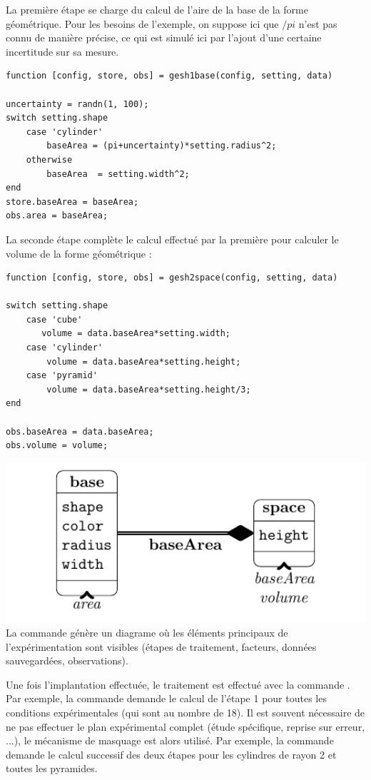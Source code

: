 La première étape se charge du calcul de l'aire de la base de la forme géométrique. Pour les besoins de l'exemple, on suppose ici que $/pi$ n'est pas connu de manière précise, ce qui est simulé ici par l'ajout d'une certaine incertitude sur sa mesure.

\begin{lstlisting}
function [config, store, obs] = gesh1base(config, setting, data)

uncertainty = randn(1, 100);
switch setting.shape
    case 'cylinder'
        baseArea = (pi+uncertainty)*setting.radius^2;
    otherwise
        baseArea  = setting.width^2;
end
store.baseArea = baseArea;
obs.area = baseArea;
\end{lstlisting}

La seconde étape complète le calcul effectué par la première pour calculer le volume de la forme géométrique :
\begin{lstlisting}
function [config, store, obs] = gesh2space(config, setting, data)

switch setting.shape
    case 'cube'
       volume = data.baseArea*setting.width;
    case 'cylinder'
        volume = data.baseArea*setting.height;
    case 'pyramid'
        volume = data.baseArea*setting.height/3;
end

obs.baseArea = data.baseArea;
obs.volume = volume;
\end{lstlisting}

\begin{marginfigure}
\includegraphics[width=1.2\textwidth]{figures/factors}
La commande  génère un diagrame où les éléments principaux de l'expérimentation sont visibles (étapes de traitement, facteurs, données sauvegardées, observations).
\end{marginfigure}

Une fois l'implantation effectuée, le traitement est effectué avec la commande . Par exemple, la commande  demande le calcul de l'étape 1 pour toutes les conditions expérimentales (qui sont au nombre de 18). Il est souvent nécessaire de ne pas effectuer le plan expérimental complet (étude spécifique, reprise sur erreur, ...), le mécanisme de masquage est alors utilisé. Par exemple, la commande  demande le calcul successif des deux étapes pour les cylindres de rayon 2 et toutes les pyramides.

